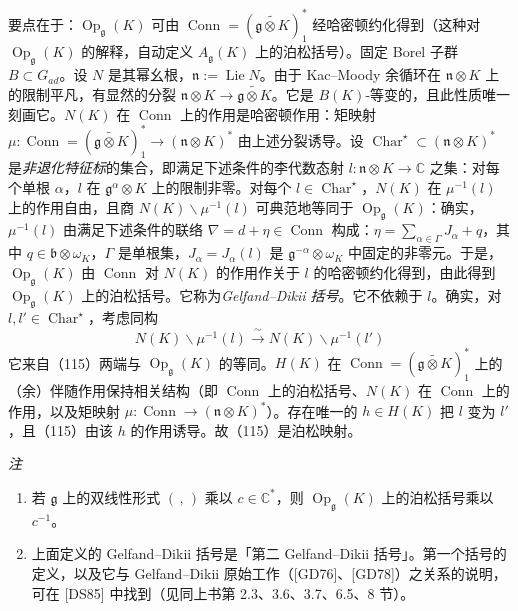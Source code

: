 要点在于：$\operatorname{Op}_{\mathfrak{g}}(K)$ 可由 $\operatorname{Conn}=(\widetilde{\mathfrak{g}\otimes K})^*_1$ 经哈密顿约化得到（这种对 $\operatorname{Op}_{\mathfrak{g}}(K)$ 的解释，自动定义 $A_{\mathfrak{g}}(K)$ 上的泊松括号）。固定 Borel 子群 $B\subset G_{ad}$。设 $N$ 是其幂幺根，$\mathfrak{n}:=\operatorname{Lie}N$。由于 Kac--Moody 余循环在 $\mathfrak{n}\otimes K$ 上的限制平凡，有显然的分裂 $\mathfrak{n}\otimes K\to\widetilde{\mathfrak{g}\otimes K}$。它是 $B(K)$-等变的，且此性质唯一刻画它。$N(K)$ 在 $\operatorname{Conn}$ 上的作用是哈密顿作用：矩映射 $\mu:\operatorname{Conn}=(\widetilde{\mathfrak{g}\otimes K})^*_1\to(\mathfrak{n}\otimes K)^*$ 由上述分裂诱导。设 $\operatorname{Char}^{\star}\subset(\mathfrak{n}\otimes K)^*$ 是\emph{非退化特征标}的集合，即满足下述条件的李代数态射 $l:\mathfrak{n}\otimes K\to\mathbb{C}$ 之集：对每个单根 $\alpha$，$l$ 在 $\mathfrak{g}^\alpha\otimes K$ 上的限制非零。对每个 $l\in\operatorname{Char}^{\star}$，$N(K)$ 在 $\mu^{-1}(l)$ 上的作用自由，且商 $N(K)\backslash\mu^{-1}(l)$ 可典范地等同于 $\operatorname{Op}_{\mathfrak{g}}(K)$：确实，$\mu^{-1}(l)$ 由满足下述条件的联络 $\nabla=d+\eta\in\operatorname{Conn}$ 构成：$\eta=\sum_{\alpha\in\Gamma}J_\alpha+q$，其中 $q\in\mathfrak{b}\otimes\omega_K$，$\Gamma$ 是单根集，$J_\alpha=J_\alpha(l)$ 是 $\mathfrak{g}^{-\alpha}\otimes\omega_K$ 中固定的非零元。于是，$\operatorname{Op}_{\mathfrak{g}}(K)$ 由 $\operatorname{Conn}$ 对 $N(K)$ 的作用作关于 $l$ 的哈密顿约化得到，由此得到 $\operatorname{Op}_{\mathfrak{g}}(K)$ 上的泊松括号。它称为\emph{Gelfand--Dikii 括号}。它不依赖于 $l$。确实，对 $l,l'\in\operatorname{Char}^{\star}$，考虑同构
\begin{equation}\tag{115}
N(K)\backslash\mu^{-1}(l)\xrightarrow{\ \sim\ }N(K)\backslash\mu^{-1}(l')
\end{equation}
它来自（115）两端与 $\operatorname{Op}_{\mathfrak{g}}(K)$ 的等同。$H(K)$ 在 $\operatorname{Conn}=(\widetilde{\mathfrak{g}\otimes K})^*_1$ 上的（余）伴随作用保持相关结构（即 $\operatorname{Conn}$ 上的泊松括号、$N(K)$ 在 $\operatorname{Conn}$ 上的作用，以及矩映射 $\mu:\operatorname{Conn}\to(\mathfrak{n}\otimes K)^*$）。存在唯一的 $h\in H(K)$ 把 $l$ 变为 $l'$，且（115）由该 $h$ 的作用诱导。故（115）是泊松映射。

\emph{注}
\begin{enumerate}[label=(\roman*),leftmargin=2.2em]
\item 若 $\mathfrak{g}$ 上的双线性形式 $(\,,\,)$ 乘以 $c\in\mathbb{C}^*$，则 $\operatorname{Op}_{\mathfrak{g}}(K)$ 上的泊松括号乘以 $c^{-1}$。
\item 上面定义的 Gelfand--Dikii 括号是「第二 Gelfand--Dikii 括号」。第一个括号的定义，以及它与 Gelfand--Dikii 原始工作（[GD76]、[GD78]）之关系的说明，可在 [DS85] 中找到（见同上书第 2.3、3.6、3.7、6.5、8 节）。
\end{enumerate}

